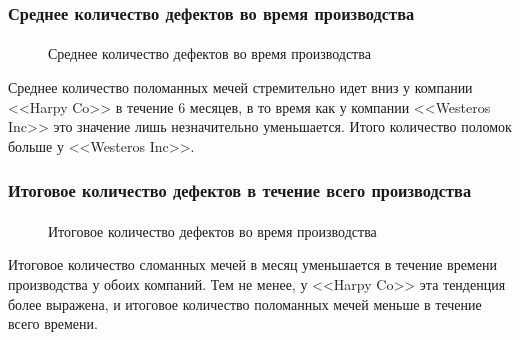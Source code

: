 \documentclass[10pt,pdf,hyperref={unicode}]{beamer}
\begin{document}
\begin{frame}
\frametitle{Среднее количество дефектов во время производства} 
\framesubtitle{}

\begin{minipage}{0.4\textwidth}
 	\begin{figure}[L]
		\caption{Среднее количество дефектов во время производства}	
	\end{figure}
\end{minipage}
\hfill
\begin{minipage}{0.4\textwidth}
	Среднее количество поломанных мечей стремительно идет вниз у компании <<Harpy Co>> в течение 6 месяцев, в то время как у компании <<Westeros Inc>> это значение лишь незначительно уменьшается. Итого количество поломок больше у <<Westeros Inc>>. 
\end{minipage}
\end{frame}


\begin{frame}
\frametitle{Итоговое количество дефектов в течение всего производства} 
\framesubtitle{}

\begin{minipage}{0.4\textwidth}
 	\begin{figure}[L]
		\caption{Итоговое количество дефектов во время производства}	
	\end{figure}
\end{minipage}
\hfill
\begin{minipage}{0.4\textwidth}
	Итоговое количество сломанных мечей в месяц уменьшается в течение времени производства у обоих компаний. Тем не менее, у <<Harpy Co>> эта тенденция более выражена, и итоговое количество поломанных мечей меньше в течение всего времени.  
\end{minipage}
\end{frame}
\end{document}
